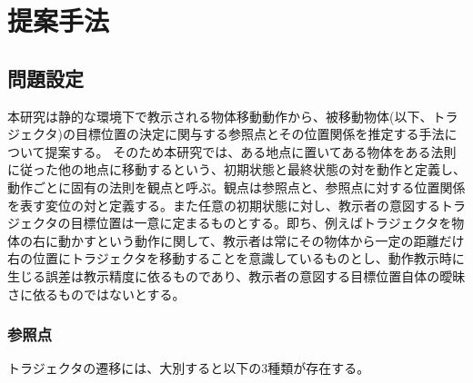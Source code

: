 ﻿%



\chapter{提案手法}

\section{問題設定}

本研究は静的な環境下で教示される物体移動動作から、被移動物体(以下、トラジェクタ)の目標位置の決定に関与する参照点とその位置関係を推定する手法について提案する。
そのため本研究では、ある地点に置いてある物体をある法則に従った他の地点に移動するという、初期状態と最終状態の対を動作と定義し、動作ごとに固有の法則を観点と呼ぶ。観点は参照点と、参照点に対する位置関係を表す変位の対と定義する。また任意の初期状態に対し、教示者の意図するトラジェクタの目標位置は一意に定まるものとする。即ち、例えばトラジェクタを物体の右に動かすという動作に関して、教示者は常にその物体から一定の距離だけ右の位置にトラジェクタを移動することを意識しているものとし、動作教示時に生じる誤差は教示精度に依るものであり、教示者の意図する目標位置自体の曖昧さに依るものではないとする。

\subsection{参照点}

トラジェクタの遷移には、大別すると以下の3種類が存在する。

